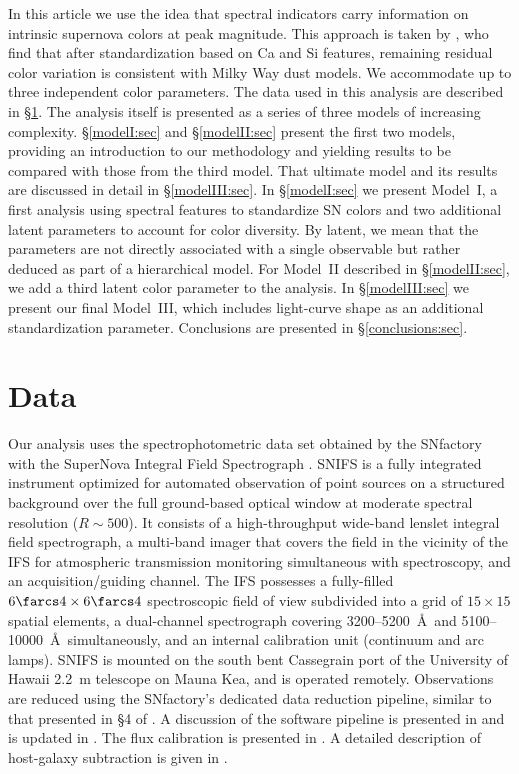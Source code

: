 \documentclass[trackchanges]{aastex62}   	%
\begin{document}
In this article we use the idea that spectral indicators carry information on intrinsic supernova colors at peak magnitude.
This approach is taken by \citet{2011A&A...529L...4C}, who find that after standardization based on Ca and Si features, remaining residual color
variation is consistent with Milky Way dust models.
We accommodate up to  three independent color parameters.
The data used in this analysis are described in \S\ref{data:sec}.
The analysis itself is presented as a series of three models of increasing complexity.
\S\ref{modelI:sec}  and  \S\ref{modelII:sec} present the first two models, providing an introduction to
our methodology and yielding results to be compared with those from the third model.
That ultimate model and its results are discussed in detail in \S\ref{modelIII:sec}. 
In \S\ref{modelI:sec} we present Model~I, 
a first analysis using spectral features to standardize SN colors
and two additional latent parameters to account for color diversity. 
By latent, we mean that the parameters are not directly associated with a single observable but rather deduced
as part of a hierarchical
model.
For Model~II described in \S\ref{modelII:sec}, we add a third latent color parameter to the analysis.
In \S\ref{modelIII:sec} we present our final Model~III, which  includes light-curve shape as an additional standardization parameter.
Conclusions are presented in \S\ref{conclusions:sec}.

\section{Data}
\label{data:sec}

Our analysis uses the spectrophotometric data set obtained by
the SNfactory with the SuperNova Integral Field
Spectrograph \citep[SNIFS,][]{2002SPIE.4836...61A, 2004SPIE.5249..146L}.  SNIFS is a fully integrated
instrument optimized for automated observation of point sources on a
structured background over the full ground-based optical window at
moderate spectral resolution ($R \sim 500$).  It consists of a
high-throughput wide-band lenslet integral field spectrograph, a multi-band
imager that covers the field in the vicinity of
the IFS for atmospheric transmission monitoring simultaneous with
spectroscopy, and an acquisition/guiding channel.  The IFS possesses a
fully-filled $6\farcs 4 \times 6\farcs 4$ spectroscopic field of view
subdivided into a grid of $15 \times 15$ spatial elements, a
dual-channel spectrograph covering 3200--5200~\AA\ and 5100--10000~\AA\
simultaneously, and an internal calibration unit (continuum and arc
lamps).  SNIFS is mounted on the south bent Cassegrain port of the
University of Hawaii 2.2~m telescope on Mauna Kea, and is operated
remotely.  Observations are reduced using the SNfactory's dedicated data
reduction pipeline, similar to that presented in \S4 of \citet{2001MNRAS.326...23B}.
A discussion of the software pipeline is presented in
\citet{2006ApJ...650..510A} and is updated in \citet{2010ApJ...713.1073S}. 
The flux calibration is presented in \citet{2013A&A...549A...8B}.
A detailed
description of host-galaxy subtraction is given in \citet{2011MNRAS.418..258B}.
\end{document}
